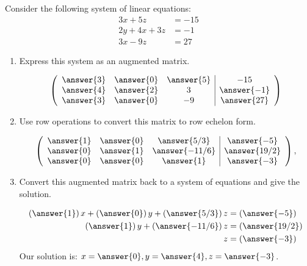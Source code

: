 \documentclass[handout]{ximera}
\author{Parisa Fatheddin}
\begin{document}
\begin{exercise}
Consider the following system of linear equations:
\begin{align*}
      3x + 5z &=  -15 \\
     2y+4x+3z&= -1\\
     3x -9z&= 27
\end{align*}
\begin{enumerate}
\item Express this system as an augmented matrix.
\begin{prompt}
\[
\left(\begin{array}{ccc|c}
  \answer{3} &  \answer{0} & \answer{5} &-15 \\
  \answer{4} & \answer{2} & 3 & \answer{-1} \\
  \answer{3} &  \answer{0} & -9 & \answer{27}
\end{array}\right)
\]
\end{prompt}
\item Use row operations to convert this matrix to row echelon form.
\begin{prompt}
\[
\left(\begin{array}{ccc|c}
  \answer{1} &  \answer{0} & \answer{5/3} &\answer{-5} \\
  \answer{0} & \answer{1} & \answer{-11/6} & \answer{19/2} \\
  \answer{0} &  \answer{0} & \answer{1} & \answer{-3}
\end{array}\right),
\]
\end{prompt}
\item Convert this augmented matrix back to a system of equations
and give the solution.
\begin{prompt}
\begin{align*}
      \left(\answer{1}\right)x + \left(\answer{0}\right)y + \left(\answer{5/3}\right)z &= \left(\answer{-5}\right) \\
     \left(\answer{1}\right)y+\left(\answer{-11/6}\right)z&=\left(\answer{19/2}\right)\\
     z&=\left(\answer{-3}\right)
\end{align*}
Our solution is: $x= \answer{0}, y= \answer{4}, z=\answer{-3}$.
\end{prompt}
\end{enumerate}
\end{exercise}
\end{document}
